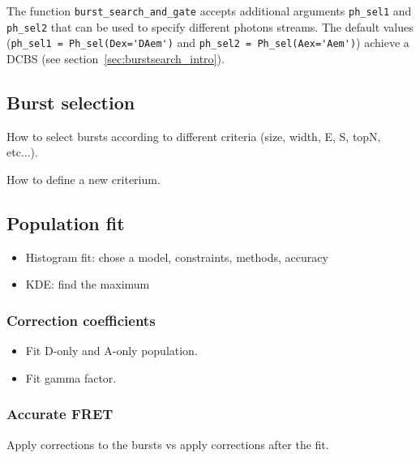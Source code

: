 The function \verb|burst_search_and_gate| accepts additional arguments \verb|ph_sel1| and \verb|ph_sel2| 
that can be used to specify different photons streams. The default values 
(\verb|ph_sel1 = Ph_sel(Dex='DAem')| and \verb|ph_sel2 = Ph_sel(Aex='Aem')|) achieve a DCBS 
(see section~\ref{sec:burstsearch_intro}).

\subsection{Burst selection}

How to select bursts according to different criteria (size, width, E, S, topN, etc...).

How to define a new criterium.


\subsection{Population fit}

\begin{itemize}
\item Histogram fit: chose a model, constraints, methods, accuracy
\item KDE: find the maximum
\end{itemize}

\subsubsection{Correction coefficients}

\begin{itemize}
\item Fit D-only and A-only population.
\item Fit gamma factor.
\end{itemize}


\subsubsection{Accurate FRET}

Apply corrections to the bursts vs apply corrections after the fit.

